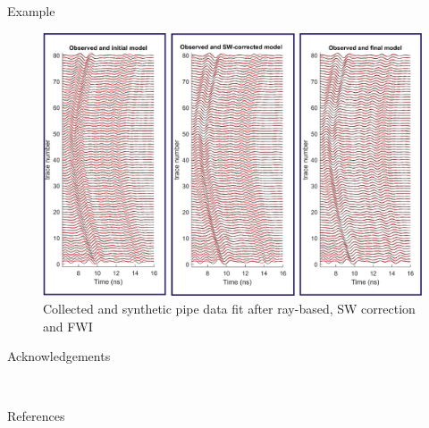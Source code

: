 \documentclass[final]{beamer}
\newlength{\onecolwid}
\begin{document}
\begin{frame}[t]
\begin{columns}[t]
\begin{column}{\onecolwid}
\begin{block}{Example}
	\begin{figure}
		\includegraphics[width=1\linewidth]{FWI_pipes_frames.png}
		\caption{Collected and synthetic pipe data fit after ray-based, SW correction and FWI \cite{jazayeri2017}}
	\end{figure}
	
\end{block}

\vspace{1.5cm}


\begin{block}{Acknowledgements}
	
	\small{} \\
	
\end{block}

\vspace{1.5cm}

\begin{block}{References}

\nocite{*} %
\small{
\vspace{0.25in}}


\end{block}
\end{column}
\end{columns}
\end{frame}
\end{document}
